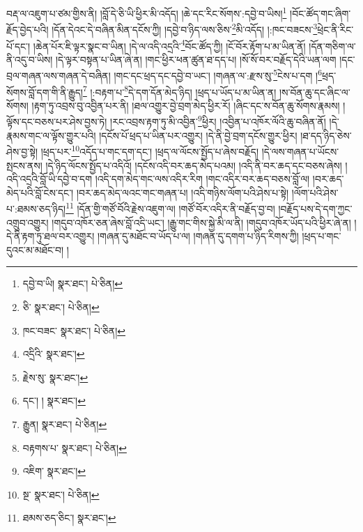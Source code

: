 བརྡ་ལ་འཇུག་པ་ཙམ་གྱིས་ནི། །བློ་དེ་ཅི་ཡི་ཕྱིར་མི་འདོད། །ཆེ་དང་རིང་སོགས་:དབྱེ་བ་ཡིས།\footnote{དབྱེ་བ་ཡི།  སྣར་ཐང་།  པེ་ཅིན། } །བོང་ཚོད་གང་ཞིག་རྗོད་བྱེད་པའི། །དོན་དེའང་དེ་བཞིན་མིན་དངོས་ཀྱི། །དབྱེ་བ་ཉིད་ལས་ཅིས་\footnote{ཅི་  སྣར་ཐང་།  པེ་ཅིན། }མི་འདོད། །:ཁང་བཟངས་\footnote{ཁང་བཟང་  སྣར་ཐང་།  པེ་ཅིན། }ཕྲེང་ནི་རིང་པོ་དང་། །ཆེན་པོར་ཇི་ལྟར་སྣང་བ་ཡིན། །དེ་ལ་འདི་འདྲའི་\footnote{འདྲིའི་  སྣར་ཐང་། }བོང་ཚོད་ཀྱི། །ངོ་བོར་རྟོག་པ་མ་ཡིན་ནོ། །དོན་གཅིག་ལ་ནི་འདུ་བ་ཡིས། །དེ་ལྟར་བསྟན་པ་ཡིན་ཞེ་ན། །གང་ཕྱིར་ཕན་ཚུན་ཐ་དད་པ། །སོ་སོ་བར་བརྗོད་དེའི་ཡན་ལག །དང་བྲལ་གཞན་ལས་གཞན་དེ་བཞིན། །གང་དང་ཕྲད་དང་དབྱེ་བ་ཡང་། །གཞན་ལ་:རྫས་སུ་\footnote{རྗེས་སུ་  སྣར་ཐང་། }ངེས་པ་དག །\footnote{དང་། །  སྣར་ཐང་། }ཕྲད་སོགས་བློ་དག་གི་ནི་རྒྱུད།\footnote{རྒྱུན།  སྣར་ཐང་།  པེ་ཅིན། } །:བརྟག་པ་\footnote{བརྟགས་པ་  སྣར་ཐང་།  པེ་ཅིན། }དེ་དག་དོན་མེད་ཉིད། །ཕྲད་པ་ཡོད་པ་མ་ཡིན་ན། །ས་བོན་ཆུ་དང་ཞིང་ལ་སོགས། །རྟག་ཏུ་འབྲས་བུ་འབྱིན་པར་ནི། །ཐལ་འགྱུར་བྱེ་བྲག་མེད་ཕྱིར་རོ། །ཞིང་དང་ས་བོན་ཆུ་སོགས་རྣམས། །ལྟོས་དང་བཅས་པར་ཤེས་བྱས་ཏེ། །རང་འབྲས་རྟག་ཏུ་མི་འབྱིན་\footnote{འཇིག་  སྣར་ཐང་། }ཕྱིར། །འབྱིན་པ་འཁོར་ལོའི་ཆུ་བཞིན་ནོ། །དེ་རྣམས་གང་ལ་ལྟོས་གྱུར་པའི། །དངོས་པོ་ཕྲད་པ་ཡིན་པར་འགྱུར། །དེ་ནི་བྱེ་བྲག་དངོས་གྱུར་ཕྱིར། །ཐ་དད་ཉིད་ཅེས་ཤེས་བྱ་སྟེ། །ཕྲད་པར་\footnote{སྔ་  སྣར་ཐང་།  པེ་ཅིན། }འདོད་པ་གང་དག་དང་། །ཕྲད་ལ་ལོངས་སྤྱོད་པ་ཞེས་བརྗོད། །དེ་ལས་གཞན་པ་ཡོངས་སྤངས་ནས། །དེ་ཉིད་ལོངས་སྤྱོད་པ་འདིའོ། །དངོས་འདི་བར་ཆད་མེད་པའམ། །འདི་ནི་བར་ཆད་དང་བཅས་ཞེས། །འདི་འདྲའི་བློ་ཡི་དབྱེ་བ་དག །འདི་དག་མེད་གང་ལས་འདིར་རིག །གང་འདིར་བར་ཆད་བཅས་བློ་ལ། །བར་ཆད་མེད་པའི་བློ་ངེས་དང་། །བར་ཆད་མེད་ལའང་གང་གཞན་པ། །འདི་གཉིས་ལོག་པའི་ཤེས་པ་སྟེ། །ལོག་པའི་ཤེས་པ་:ཐམས་ཅད་ཉིད།\footnote{ཐམས་ཅད་ཅིང་།  སྣར་ཐང་། } །དོན་གྱི་གཙོ་བོའི་རྗེས་འཇུག་ལ། །གཙོ་བོར་འདིར་ནི་བརྗོད་བྱ་བ། །བརྗོད་པས་དེ་དག་ཀྱང་འགྲུབ་འགྱུར། །གདུབ་འཁོར་ཅན་ཞེས་བློ་འདི་ཡང་། །རྒྱུ་གང་གིས་སྐྱེ་མི་ལ་ནི། །གདུབ་འཁོར་ཡོད་པའི་ཕྱིར་ཞེ་ན། །དེ་ནི་རྟག་ཏུ་ཐལ་བར་འགྱུར། །གཞན་དུ་མཐོང་བ་ཡོད་པ་ལ། །གཞན་དུ་དགག་པ་ཉིད་རིགས་ཀྱི། །ཕྲད་པ་གང་དུའང་མ་མཐོང་བ། །
